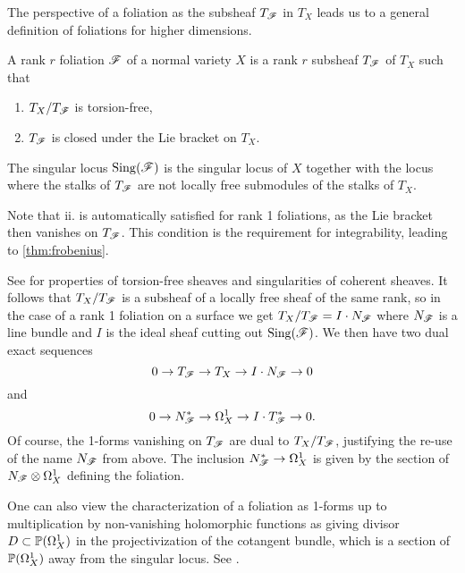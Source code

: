 The perspective of a foliation as the subsheaf $T_\scrF$ in $T_X$ leads us to a
general definition of foliations for higher dimensions.

\begin{definition}\label{defn:foliation}
    A rank $r$ foliation $\scrF$ of a normal variety $X$ is a rank $r$ subsheaf
    $T_\scrF$ of $T_X$ such that
    \begin{enumerate}[label=\roman*.]
        \item $T_X/T_\scrF$ is torsion-free,
        \item $T_\scrF$ is closed under the Lie bracket on $T_X$.
    \end{enumerate}
    The singular locus $\Sing(\scrF)$ is the singular locus of $X$ together with
    the locus where the stalks of $T_\scrF$ are not locally free submodules of
    the stalks of $T_X$.
\end{definition}

\begin{remark}
    Note that ii. is automatically satisfied for rank 1 foliations, as the Lie
    bracket then vanishes on $T_\scrF$. This condition is the requirement for
    integrability, leading to \cref{thm:frobenius}.
\end{remark}

See \cite[\S2]{friedman_book} for properties of torsion-free sheaves and
singularities of coherent sheaves. It follows that $T_X/T_\scrF$ is a subsheaf
of a locally free sheaf of the same rank, so in the case of a rank 1 foliation
on a surface we get $T_X/T_\scrF=I\cdot N_\scrF$ where $N_\scrF$ is a line
bundle and $I$ is the ideal sheaf cutting out $\Sing(\scrF)$. We then have two
dual exact sequences
\begin{equation}\label{eqn:tangent sequence}
    0 \to T_\scrF \to T_X \to I\cdot N_\scrF \to 0
\end{equation}
and
\begin{equation}\label{eqn:1-form sequence}
    0 \to N_\scrF^* \to \Omega^1_X \to I\cdot T_\scrF^* \to 0.
\end{equation}
Of course, the 1-forms vanishing on $T_\scrF$ are dual to $T_X/T_\scrF$,
justifying the re-use of the name $N_\scrF$ from above. The inclusion
$N_\scrF^*\to\Omega^1_X$ is given by the section of $N_\scrF\otimes\Omega^1_X$
defining the foliation.

\begin{remark}
    One can also view the characterization of a foliation as 1-forms up to
    multiplication by non-vanishing holomorphic functions as giving divisor
    $D\subset\P(\Omega^1_X)$ in the projectivization of the cotangent bundle,
    which is a section of $\P(\Omega^1_X)$ away from the singular locus. See
    \cite[\nopp II.0]{mcquillan_98}.
\end{remark}

